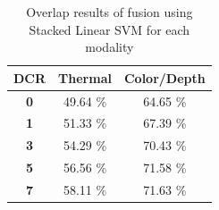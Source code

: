 \documentclass[10pt,twocolumn,letterpaper]{article}
\begin{document}
\begin{table}[h]\footnotesize
\center
\caption{Overlap results of fusion using Stacked Linear SVM for each modality}
\label{table:linearstacked}
\begin{tabular}{|c|c|c|}
\hline
\textbf{DCR}&\textbf{Thermal}&\textbf{Color/Depth}\\\hline
\textbf{0}&49.64 \%&64.65 \%\\\hline
\textbf{1}&51.33 \%&67.39 \%\\\hline
\textbf{3}&54.29 \%&70.43 \%\\\hline
\textbf{5}&56.56 \%&71.58 \%\\\hline
\textbf{7}&58.11 \%&71.63 \%\\\hline
\end{tabular}
\end{table}

\end{document}

